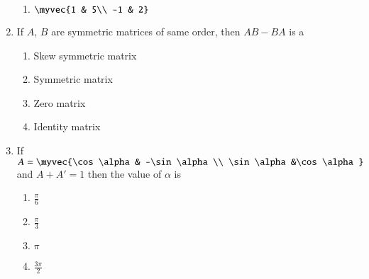 \documentclass{article}
\theoremstyle{remark}
\begin{document}
\begin{enumerate}
\begin{enumerate}[label=(\roman*)]
\item $\myvec{1 & 5\\ -1 & 2}$
\end{enumerate}
\item If $A$, $B$ are symmetric matrices of same order, then $AB-BA$ is a
\begin{enumerate}
\item Skew symmetric matrix
\item Symmetric matrix
\item Zero matrix
\item Identity matrix
\end{enumerate}
\item If $A=\myvec{\cos \alpha& -\sin \alpha \\ \sin \alpha &\cos \alpha}$ and $A+A'=1$ then the value of $\alpha$ is
\begin{enumerate}
\item $\frac{\pi}{6}$
\item $\frac{\pi}{3}$
\item $\pi$
\item $\frac{3\pi}{2}$
\end{enumerate}  
\end{enumerate}
\end{document}
